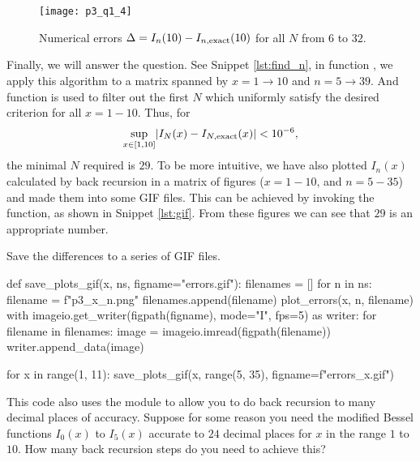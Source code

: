\begin{figure}[H]
    \centering
    \texttt{[image: p3\_q1\_4]}
    \caption{Numerical errors $\Delta = I_n(10) - I_{n,\textnormal{exact}}(10)$
        for all $N$ from $6$ to $32$.}
    \label{fig:plot_errors_10}
\end{figure}

Finally, we will answer the question. See Snippet \ref{lst:find_n},
in function , we apply this algorithm to a matrix spanned by
$x = 1 \to 10$ and $n = 5 \to 39$.
And function  is used to filter out the first $N$ which uniformly
satisfy the desired criterion for all $x = 1 - 10$.
Thus, for
%
\begin{equation}
    \sup_{x \in [1, 10]} \lvert I_N(x) - I_{N,\textnormal{exact}}(x) \rvert < 10^{-6},
\end{equation}
%
the minimal $N$ required is $29$.
To be more intuitive, we have also plotted $I_n(x)$ calculated by back recursion
in a matrix of figures ($x = 1 - 10$, and $n = 5 - 35$) and made them into some GIF files.
This can be achieved by invoking the  function, as shown in
Snippet \ref{lst:gif}. From these figures we can see that $29$ is an appropriate number.

\begin{algorithm}[H]
    \caption{Save the differences to a series of GIF files.}
    \label{lst:gif}
    \begin{pythoncode}
        def save_plots_gif(x, ns, figname="errors.gif"):
            filenames = []
            for n in ns:
                filename = f"p3_{x}_{n}.png"
                filenames.append(filename)
                plot_errors(x, n, filename)
            with imageio.get_writer(figpath(figname), mode="I", fps=5) as writer:
                for filename in filenames:
                    image = imageio.imread(figpath(filename))
                    writer.append_data(image)

        for x in range(1, 11):
            save_plots_gif(x, range(5, 35), figname=f"errors_{x}.gif")
        \end{pythoncode}
\end{algorithm}

\Question This code also uses the  module to allow you to do back recursion to many
decimal places of accuracy. Suppose for some reason you need the modified Bessel functions
$I_0(x)$ to $I_5(x)$ accurate to $24$ decimal places for $x$ in the range $1$ to $10$. How
many back recursion steps do you need to achieve this?

